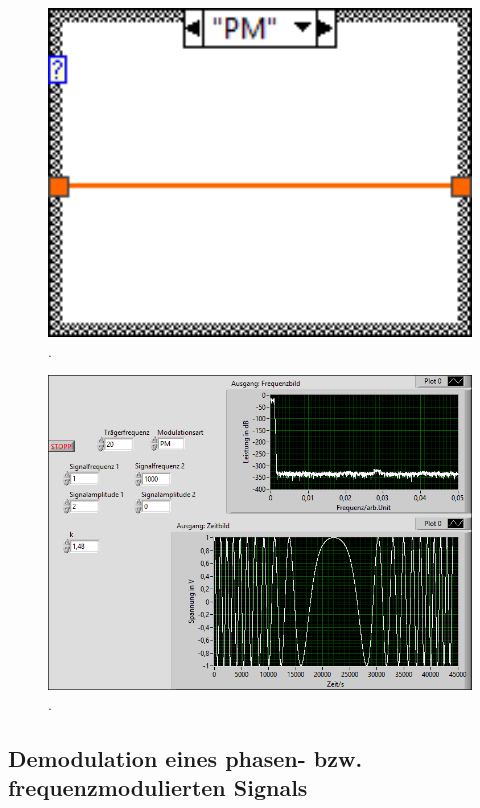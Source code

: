 \documentclass[
a4paper,
12pt,
pagesize,
ngerman
]{scrartcl}
\begin{document}
	\begin{figure}[h]
		\centering
		\includegraphics[width=1.0\textwidth]{EIRE2018Dateien/Tag4/FMPM-Erzeugung/PM-FMPM-Erzeugungd1}
		\caption{.}
	\end{figure}

	\begin{figure}[h]
		\centering
		\includegraphics[width=1.0\textwidth]{EIRE2018Dateien/Tag4/FMPM-Erzeugung/PM-FMPM-Erzeugungp}
		\caption{.}
	\end{figure}
	
	\subsection{Demodulation eines phasen- bzw. frequenzmodulierten Signals}
	
\end{document}
